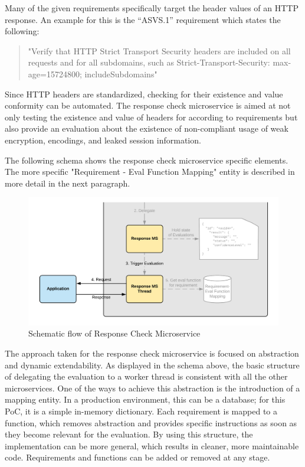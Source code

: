 Many of the given requirements specifically target the header values of an HTTP response. An example for this is the \enquote{ASVS.1} requirement which states the following:

\newpage

\begin{quote}
"Verify that HTTP Strict Transport Security headers are included on all requests and for all subdomains, such as Strict-Transport-Security: max-age=15724800; includeSubdomains"
\end{quote}

\vskip 1cm

Since HTTP headers are standardized, checking for their existence and value conformity can be automated. The response check microservice is aimed at not only testing the existence and value of headers for according to requirements but also provide an evaluation about the existence of non-compliant usage of weak encryption, encodings, and leaked session information. 

The following schema shows the response check microservice specific elements. The more specific "Requirement - Eval Function Mapping" entity is described in more detail in the next paragraph.

\begin{figure}[ht!]
\begin{center}
\includegraphics[width=17cm]{Response_Check_MS_flow.png}
\end{center}
\caption[Schematic flow of Response Check Microservice]{Schematic flow of Response Check Microservice}
\end{figure}

\newpage

The approach taken for the response check microservice is focused on abstraction and dynamic extendability.
As displayed in the schema above, the basic structure of delegating the evaluation to a worker thread is consistent with all the other microservices.
One of the ways to achieve this abstraction is the introduction of a mapping entity. In a production environment, this can be a database; for this PoC, it is a simple in-memory dictionary. 
Each requirement is mapped to a function, which removes abstraction and provides specific instructions as soon as they become relevant for the evaluation. By using this structure, the implementation can be more general, which results in cleaner, more maintainable code. Requirements and functions can be added or removed at any stage.

